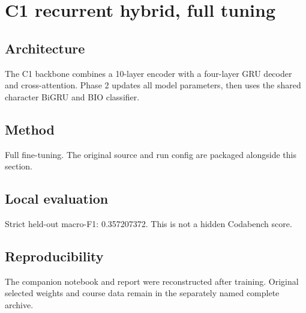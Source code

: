 \section{C1 recurrent hybrid, full tuning}
\subsection{Architecture}
The C1 backbone combines a 10-layer encoder with a four-layer GRU decoder and cross-attention. Phase 2 updates all model parameters, then uses the shared character BiGRU and BIO classifier.
\subsection{Method}
Full fine-tuning. The original source and run config are packaged alongside this section.
\subsection{Local evaluation}
Strict held-out macro-F1: 0.357207372. This is not a hidden Codabench score.
\subsection{Reproducibility}
The companion notebook and report were reconstructed after training. Original selected weights and course data remain in the separately named complete archive.
